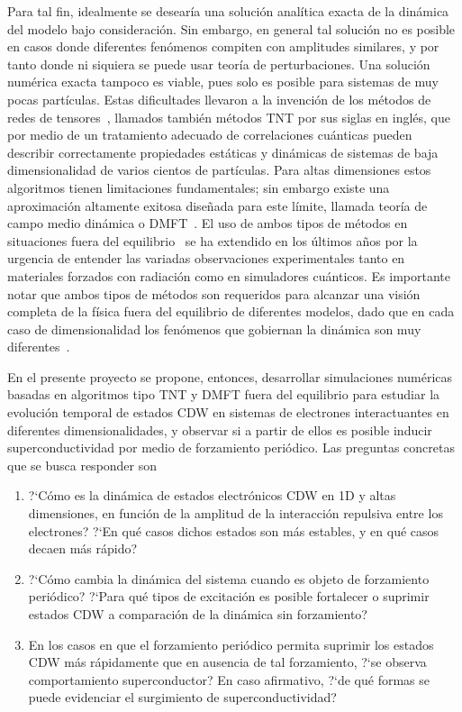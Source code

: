 \documentclass[a4paper,10pt]{article}
\begin{document}
Para tal fin, idealmente se desear\'ia una soluci\'on anal\'itica exacta de la din\'amica del modelo bajo consideraci\'on. Sin embargo, en general tal soluci\'on no es posible en casos donde diferentes fen\'omenos compiten con amplitudes similares, y por tanto donde ni siquiera se puede usar teor\'ia de perturbaciones. Una soluci\'on num\'erica exacta tampoco es viable, pues solo es posible para sistemas de muy pocas part\'iculas. Estas dificultades llevaron a la invenci\'on de los m\'etodos de redes de tensores~\cite{schollwock2011ann}, llamados tambi\'en m\'etodos TNT por sus siglas en ingl\'es, que por medio de un tratamiento adecuado de correlaciones cu\'anticas pueden describir correctamente propiedades est\'aticas y din\'amicas de sistemas de baja dimensionalidad de varios cientos de part\'iculas. Para altas dimensiones estos algoritmos tienen limitaciones fundamentales; sin embargo existe una aproximaci\'on altamente exitosa dise\~nada para este l\'imite, llamada teor\'ia de campo medio din\'amica o DMFT~\cite{georges1996rmp}. El uso de ambos tipos de m\'etodos en situaciones fuera del equilibrio~\cite{eckstein2014rmp} se ha extendido en los \'ultimos a\~nos por la urgencia de entender las variadas observaciones experimentales tanto en materiales forzados con radiaci\'on como en simuladores cu\'anticos. Es importante notar que ambos tipos de m\'etodos son requeridos para alcanzar una visi\'on completa de la f\'isica fuera del equilibrio de diferentes modelos, dado que en cada caso de dimensionalidad los fen\'omenos que gobiernan la din\'amica son muy diferentes~\cite{balzer2015prx}.  

En el presente proyecto se propone, entonces, desarrollar simulaciones num\'ericas basadas en algoritmos tipo TNT y DMFT fuera del equilibrio para estudiar la evoluci\'on temporal de estados CDW en sistemas de electrones interactuantes en diferentes dimensionalidades, y observar si a partir de ellos es posible inducir superconductividad por medio de forzamiento peri\'odico. Las preguntas concretas que se busca responder son

\begin{enumerate}

\item ?`C\'omo es la din\'amica de estados electr\'onicos CDW en 1D y altas dimensiones, en funci\'on de la amplitud de la interacci\'on repulsiva entre los electrones? ?`En qu\'e casos dichos estados son m\'as estables, y en qu\'e casos decaen m\'as r\'apido?

\item ?`C\'omo cambia la din\'amica del sistema cuando es objeto de forzamiento peri\'odico? ?`Para qu\'e tipos de excitaci\'on es posible fortalecer o suprimir estados CDW a comparaci\'on de la din\'amica sin forzamiento? 

\item En los casos en que el forzamiento peri\'odico permita suprimir los estados CDW m\'as r\'apidamente que en ausencia de tal forzamiento, ?`se observa comportamiento superconductor? En caso afirmativo, ?`de qu\'e formas se puede evidenciar el surgimiento de superconductividad? 

\end{enumerate}
\end{document}
